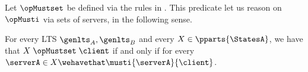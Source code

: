 Let $\opMustset$ be defined via the rules in .
This predicate let us reason on~$\opMusti$ via sets of servers,
in the following sense.
\begin{lemma}
  \label{lem:musti-if-mustset-helper}
  For every LTS $\genlts_A, \genlts_B$ and every
  $X \in \pparts{\StatesA}$, we have that
  $\mustset{X}{\client}$ if and only if for every $\serverA \in X
  \wehavethat \musti{\serverA}{\client}$.
\end{lemma}


